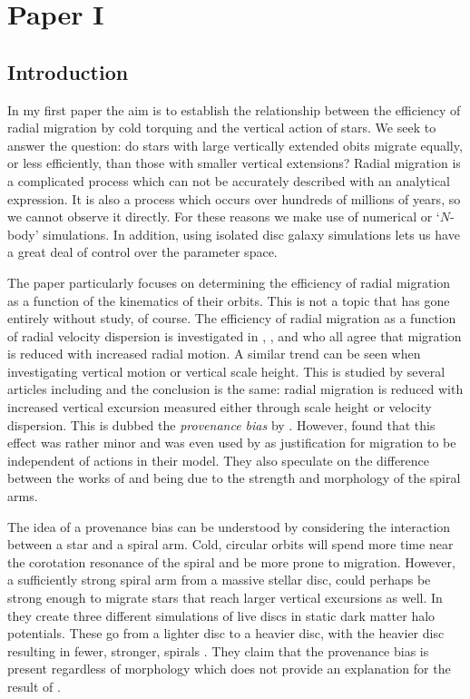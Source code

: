 \chapter{Paper I}\label{chap:paper1}
\section{Introduction}\label{sec:p1-intro}
In my first paper the aim is to establish the relationship between the efficiency of radial migration by cold torquing and the vertical action of stars. We seek to answer the question: do stars with large vertically extended obits migrate equally, or less efficiently, than those with smaller vertical extensions? Radial migration is a complicated process which can not be accurately described with an analytical expression. It is also a process which occurs over hundreds of millions of years, so we cannot observe it directly. For these reasons we make use of numerical or `$N$-body' simulations. In addition, using isolated disc galaxy simulations lets us have a great deal of control over the parameter space. 

The paper particularly focuses on determining the efficiency of radial migration as a function of the kinematics of their orbits. This is not a topic that has gone entirely without study, of course. The efficiency of radial migration as a function of radial velocity dispersion is investigated in \cite{solway:12}, \cite{vera-ciro:14}, and \cite{daniel:18} who all agree that migration is reduced with increased radial motion. A similar trend can be seen when investigating vertical motion or vertical scale height. This is studied by several articles including \cite{solway:12, vera-ciro:14, halle:2015, vera-ciro:16b} and the conclusion is the same: radial migration is reduced with increased vertical excursion measured either through scale height or velocity dispersion. This is dubbed the \textit{provenance bias} by \cite{vera-ciro:14}. However, \cite{solway:12} found that this effect was rather minor and was even used by \cite{schonrich:17} as justification for migration to be independent of actions in their model. They also speculate on the difference between the works of \cite{solway:12} and \cite{vera-ciro:14} being due to the strength and morphology of the spiral arms. 

The idea of a provenance bias can be understood by considering the interaction between a star and a spiral arm. Cold, circular orbits will spend more time near the corotation resonance of the spiral and be more prone to migration. However, a sufficiently strong spiral arm from a massive stellar disc, could perhaps be strong enough to migrate stars that reach larger vertical excursions as well. In \cite{vera-ciro:16b} they create three different simulations of live discs in static dark matter halo potentials. These go from a lighter disc to a heavier disc, with the heavier disc resulting in fewer, stronger, spirals \citep{donghia:15}. They claim that the provenance bias is present regardless of morphology which does not provide an explanation for the result of \cite{solway:12}.

